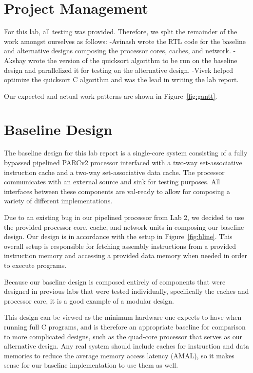 \documentclass[10pt]{article}
\begin{document}
\section{Project Management}

% 
For this lab, all testing was provided. Therefore, we split the remainder of the work amongst ourselves as follows:
-Avinash wrote the RTL code for the baseline and alternative designs composing the processor cores, caches, and network.
-Akshay wrote the version of the quicksort algorithm to be run on the baseline design and parallelized it for testing on the alternative design.
-Vivek helped optimize the quicksort C algorithm and was the lead in writing the lab report. \par

Our expected and actual work patterns are shown in Figure~\ref{fig:gantt}.


\section{Baseline Design}

The baseline design for this lab report is a single-core system consisting of a fully bypassed pipelined PARCv2 
processor interfaced with a two-way set-associative instruction cache and a two-way set-associative data cache. 
The processor communicates with an external source and sink for testing purposes. All interfaces between these
components are val-ready to allow for composing a variety of different implementations. \par

Due to an existing bug in our pipelined processor from Lab 2, we decided to use the provided processor core, 
cache, and network units in composing our baseline design. Our design is in accordance with the setup in 
Figure~\ref{fig:bline}. This overall setup is responsible for fetching assembly instructions from a provided
instruction memory and accessing a provided data memory when needed in order to execute programs.

Because our baseline design is composed entirely of components that were designed in previous labs that were 
tested individually, specifically the caches and processor core, it is a good example of a modular design. 

This design can be viewed as the minimum hardware one expects to have when running full C programs, and is therefore
an appropriate baseline for comparison to more complicated designs, such as the quad-core processor that serves as
our alternative design. Any real system should include caches for instruction and data memories to reduce the average memory
access latency (AMAL), so it makes sense for our baseline implementation to use them as well. 
\end{document}
